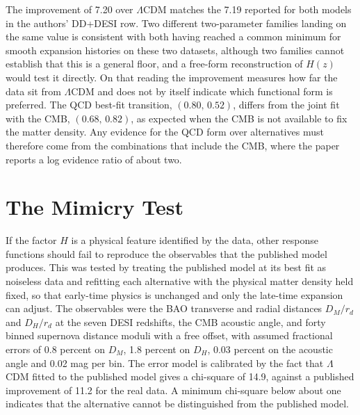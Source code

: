 \documentclass[11pt]{article}
\begin{document}
The improvement of 7.20 over $\Lambda$CDM matches the 7.19 reported for both models in the authors' DD+DESI row. Two different two-parameter families landing on the same value is consistent with both having reached a common minimum for smooth expansion histories on these two datasets, although two families cannot establish that this is a general floor, and a free-form reconstruction of $H(z)$ would test it directly. On that reading the improvement measures how far the data sit from $\Lambda$CDM and does not by itself indicate which functional form is preferred. The QCD best-fit transition, $(0.80,\,0.52)$, differs from the joint fit with the CMB, $(0.68,\,0.82)$, as expected when the CMB is not available to fix the matter density. Any evidence for the QCD form over alternatives must therefore come from the combinations that include the CMB, where the paper reports a log evidence ratio of about two.

\section{The Mimicry Test}

If the factor $H$ is a physical feature identified by the data, other response functions should fail to reproduce the observables that the published model produces. This was tested by treating the published model at its best fit as noiseless data and refitting each alternative with the physical matter density held fixed, so that early-time physics is unchanged and only the late-time expansion can adjust. The observables were the BAO transverse and radial distances $D_M/r_d$ and $D_H/r_d$ at the seven DESI redshifts, the CMB acoustic angle, and forty binned supernova distance moduli with a free offset, with assumed fractional errors of 0.8 percent on $D_M$, 1.8 percent on $D_H$, 0.03 percent on the acoustic angle and 0.02 mag per bin. The error model is calibrated by the fact that $\Lambda$CDM fitted to the published model gives a chi-square of 14.9, against a published improvement of 11.2 for the real data. A minimum chi-square below about one indicates that the alternative cannot be distinguished from the published model.
\end{document}

